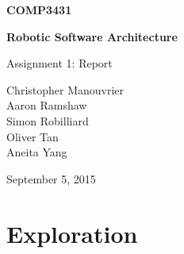 \documentclass[titlepage,12pt,a4paper]{article}
\begin{document}
\begin{titlepage}
    \begin{center}
        \vspace*{3cm}
        
        \Huge
        \textbf{COMP3431\\}
        \title{}
        \vspace{0.5cm}
        \Huge
        \textbf{Robotic Software Architecture}
        
        \vspace{0.54cm}
        
        \Large
        Assignment 1: Report
        
        \vspace{5cm}

	\normalsize
	Christopher Manouvrier\\
	Aaron Ramshaw\\
	Simon Robilliard\\
	Oliver Tan\\
	Aneita Yang
        
	\vfill
        
        \Large
        September 5, 2015
        
    \end{center}
\end{titlepage}

\pagebreak

\section*{Exploration}
\end{document}
